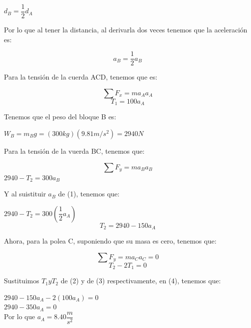 \documentclass[a4paper,11pt]{scrartcl}
\begin{document}
\begin{center}
\begin{center}
$d_{B} =  \dfrac{1}{2} d_{A} $ \\
\end{center}
Por lo que al tener la distancia, al derivarla dos veces tenemos que la aceleración es:
\begin{center}
\begin{equation}
a_{B} = \dfrac{1}{2} a_{B}
\end{equation}
\end{center} 
Para la tensión de la cuerda ACD, tenemos que es:\\
\begin{center}
\[
\sum F_{x} = ma_{A}a_{A}
\]
\begin{equation}
 T_{1} = 100a_{A}
\end{equation}
\end{center} 
Tenemos que el peso del bloque B es:\\
\begin{center}
$W_{B} = m_{B}g = (300 kg)(9.81 m/s^{2}) = 2940 N $ \\
\end{center}
Para la tensión de la vuerda BC, tenemos que:\\
\begin{center}
\[
\sum F_{y} = ma_{B}a_{B}
\]
 $ 2940 - T_{2} = 300a_{B} $
\end{center} 
Y al suistituir $ a_{B} $ de (1), tenemos que:\\
\begin{center}
$ 2940 -  T_{2} = 300(\dfrac{1}{2}a_{A}) $\\
\begin{equation}
 T_{2} = 2940 - 150a_{A}
\end{equation}
\end{center} 
Ahora, para la polea C, suponiendo que su masa es cero, tenemos que:
\begin{center}
\[
\sum F_{y} = ma_{C}a_{C} = 0
\]
\begin{equation}
 T_{2} - 2T_{1}= 0
\end{equation}
\end{center}
Sustituimos $ T_{1} y T_{2} $ de (2) y de (3) respectivamente, en (4), tenemos que:  \\
\begin{center}
$ 2940 -  150a_{A} - 2(100a_{A}) = 0 $ \\
$ 2940 - 350a_{A} = 0 $ \\
Por lo que $ a_{A}= 8.40  \dfrac{m}{s^{2}}$\\

\end{center}
\end{center}
\end{document}
